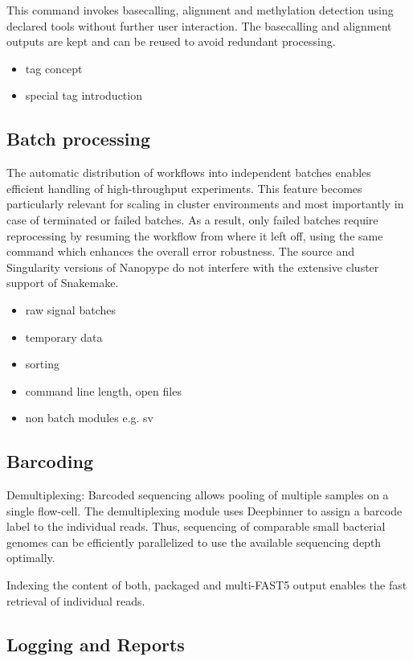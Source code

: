 This command invokes basecalling, alignment and methylation detection using declared tools without further user interaction. The basecalling and alignment outputs are kept and can be reused to avoid redundant processing.

\begin{itemize}
	\item tag concept
	\item special tag introduction
\end{itemize}

\subsection{Batch processing}
The automatic distribution of workflows into independent batches enables efficient handling of high-throughput experiments. This feature becomes particularly relevant for scaling in cluster environments and most importantly in case of terminated or failed batches. As a result, only failed batches require reprocessing by resuming the workflow from where it left off, using the same command which enhances the overall error robustness.
The source and Singularity versions of Nanopype do not interfere with the extensive cluster support of Snakemake.

\begin{itemize}
	\item raw signal batches
	\item temporary data
	\item sorting
	\item command line length, open files
	\item non batch modules e.g. sv
\end{itemize}

\subsection{Barcoding}

Demultiplexing: Barcoded sequencing allows pooling of multiple samples on a single flow-cell. The demultiplexing module uses Deepbinner \cite{Wick2018} to assign a barcode label to the individual reads. Thus, sequencing of comparable small bacterial genomes can be efficiently parallelized to use the available sequencing depth optimally.

Indexing the content of both, packaged and multi-FAST5 output enables the fast retrieval of individual reads. 

\subsection{Logging and Reports}

